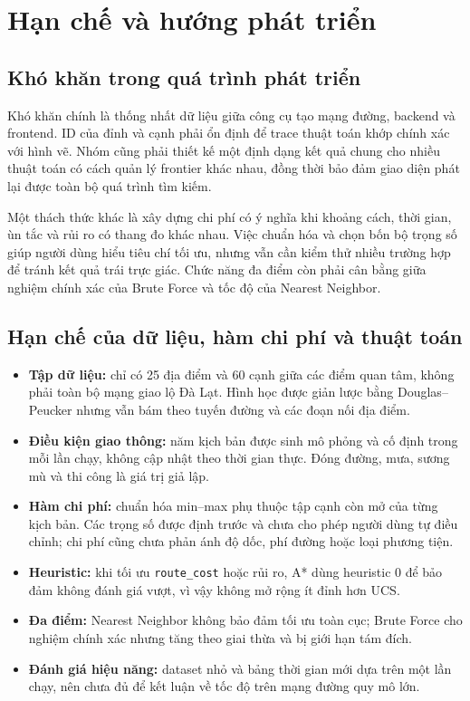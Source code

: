 
\chapter{Hạn chế và hướng phát triển}
\label{chap:limitations}

\section{Khó khăn trong quá trình phát triển}

Khó khăn chính là thống nhất dữ liệu giữa công cụ tạo mạng đường, backend và
frontend. ID của đỉnh và cạnh phải ổn định để trace thuật toán khớp chính xác
với hình vẽ. Nhóm cũng phải thiết kế một định dạng kết quả chung cho nhiều
thuật toán có cách quản lý frontier khác nhau, đồng thời bảo đảm giao diện phát
lại được toàn bộ quá trình tìm kiếm.

Một thách thức khác là xây dựng chi phí có ý nghĩa khi khoảng cách, thời gian,
ùn tắc và rủi ro có thang đo khác nhau. Việc chuẩn hóa và chọn bốn bộ trọng số
giúp người dùng hiểu tiêu chí tối ưu, nhưng vẫn cần kiểm thử nhiều trường hợp để
tránh kết quả trái trực giác. Chức năng đa điểm còn phải cân bằng giữa nghiệm
chính xác của Brute Force và tốc độ của Nearest Neighbor.

\section{Hạn chế của dữ liệu, hàm chi phí và thuật toán}

\begin{itemize}[itemsep=2pt]
  \item \textbf{Tập dữ liệu:} chỉ có 25 địa điểm và 60 cạnh giữa các điểm quan
  tâm, không phải toàn bộ mạng giao lộ Đà Lạt. Hình học được giản lược bằng
  Douglas--Peucker nhưng vẫn bám theo tuyến đường và các đoạn nối địa điểm.
  \item \textbf{Điều kiện giao thông:} năm kịch bản được sinh mô phỏng và cố
  định trong mỗi lần chạy, không cập nhật theo thời gian thực. Đóng đường, mưa,
  sương mù và thi công là giá trị giả lập.
  \item \textbf{Hàm chi phí:} chuẩn hóa min--max phụ thuộc tập cạnh còn mở của
  từng kịch bản. Các trọng số được định trước và chưa cho phép người dùng tự
  điều chỉnh; chi phí cũng chưa phản ánh độ dốc, phí đường hoặc loại phương tiện.
  \item \textbf{Heuristic:} khi tối ưu \texttt{route\_cost} hoặc rủi ro, A* dùng
  heuristic 0 để bảo đảm không đánh giá vượt, vì vậy không mở rộng ít đỉnh hơn UCS.
  \item \textbf{Đa điểm:} Nearest Neighbor không bảo đảm tối ưu toàn cục; Brute
  Force cho nghiệm chính xác nhưng tăng theo giai thừa và bị giới hạn tám đích.
  \item \textbf{Đánh giá hiệu năng:} dataset nhỏ và bảng thời gian mới dựa trên
  một lần chạy, nên chưa đủ để kết luận về tốc độ trên mạng đường quy mô lớn.
\end{itemize}

